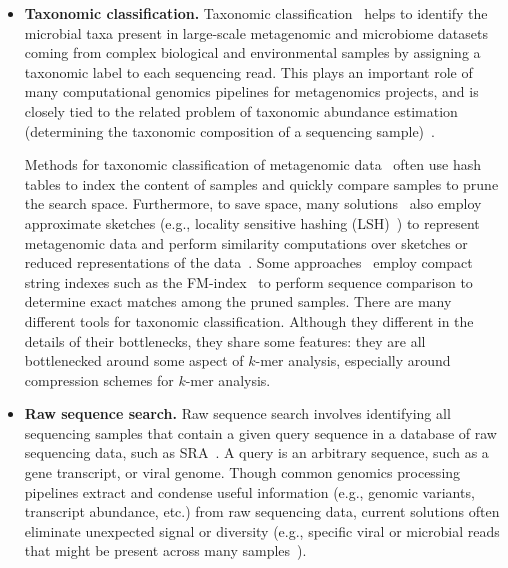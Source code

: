 \begin{itemize}%

\item \textbf{Taxonomic classification.} Taxonomic classification~\cite{wood2014kraken} helps to identify the microbial 
taxa present in large-scale metagenomic and microbiome datasets coming from complex biological and environmental samples by assigning a taxonomic label to each sequencing read. This plays an important role of many computational genomics pipelines for metagenomics projects, and is closely tied to the related problem of taxonomic abundance estimation (determining the taxonomic composition of a sequencing sample)~\cite{truong2015metaphlan2,skoufos2022agamemnon,wei2022kmcp}.

 

Methods for taxonomic classification of metagenomic data~\cite{wood2014kraken} often use hash tables to index the \kmer content of samples and quickly compare samples to prune the search space.
Furthermore, to save space, many solutions~\cite{wood2019improved} also employ approximate sketches (e.g., locality sensitive hashing (LSH)~\cite{roberts2004reducing, Marais2019}) to represent metagenomic data and perform similarity computations over sketches or reduced representations of the data~\cite{Shaw2023}.
Some approaches~\cite{kim2016centrifuge} employ compact string indexes such as the FM-index~\cite{ferragina2000opportunistic} to perform sequence comparison to determine exact matches among the pruned samples. There are many different tools for taxonomic classification.  Although they different in the details of their bottlenecks, they share some features: they are all bottlenecked around some aspect of $k$-mer analysis, especially around compression schemes for $k$-mer analysis.

 

\item \textbf{Raw sequence search.} Raw sequence search involves identifying all sequencing samples that contain a given query sequence in a database of raw sequencing data, such as SRA~\cite{kodama2012sequence}. A query is an arbitrary sequence, such as a gene transcript, or viral genome. Though common genomics processing pipelines extract and condense useful information (e.g., genomic variants, transcript abundance, etc.) from raw sequencing data, current solutions often eliminate unexpected signal or diversity (e.g., specific viral or microbial reads that might be present across many samples~\cite{Edgar2022}). 


\end{itemize}
